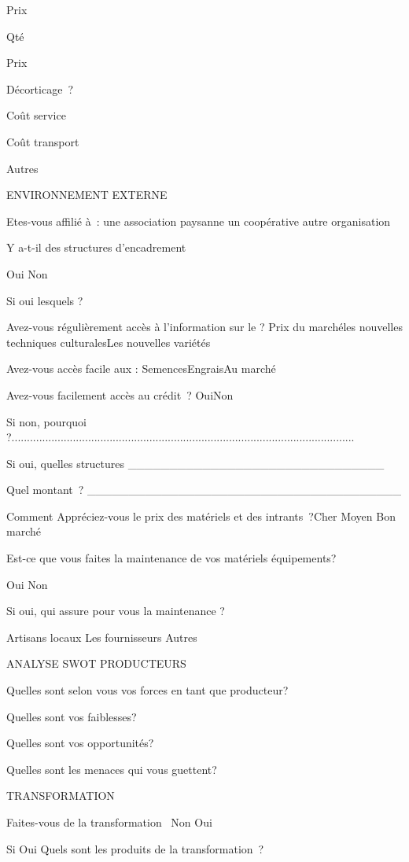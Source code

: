 \documentclass[12pt,oneside]{report}
\begin{document}
Prix

Qté

Prix

Décorticage ?

Coût service

Coût transport

Autres

ENVIRONNEMENT EXTERNE

Etes-vous affilié à : une  association paysanne   un coopérative  autre organisation

Y a-t-il des structures d’encadrement

Oui Non

Si oui lesquels ?

Avez-vous régulièrement accès à l’information sur le ? Prix du marchéles nouvelles techniques culturalesLes nouvelles variétés

Avez-vous accès facile aux : SemencesEngraisAu marché

Avez-vous facilement accès au crédit ? OuiNon

Si non, pourquoi ?................................................................................................................

Si oui, quelles structures \_\_\_\_\_\_\_\_\_\_\_\_\_\_\_\_\_\_\_\_\_\_\_\_\_\_\_\_\_\_\_

Quel montant ? \_\_\_\_\_\_\_\_\_\_\_\_\_\_\_\_\_\_\_\_\_\_\_\_\_\_\_\_\_\_\_\_\_\_\_\_\_\_

Comment Appréciez-vous le prix des matériels et des intrants ?Cher   Moyen      Bon marché

Est-ce que vous faites la maintenance de vos matériels équipements?

Oui Non

Si oui, qui assure pour vous la maintenance ?

Artisans locaux  Les fournisseurs  Autres

ANALYSE SWOT PRODUCTEURS

Quelles sont selon vous vos forces en tant que producteur?

Quelles sont vos faiblesses?

Quelles sont vos opportunités?

Quelles sont les menaces qui vous guettent?

TRANSFORMATION

Faites-vous de la transformation  Non        Oui

Si Oui Quels sont les produits de la transformation ?
\end{document}
